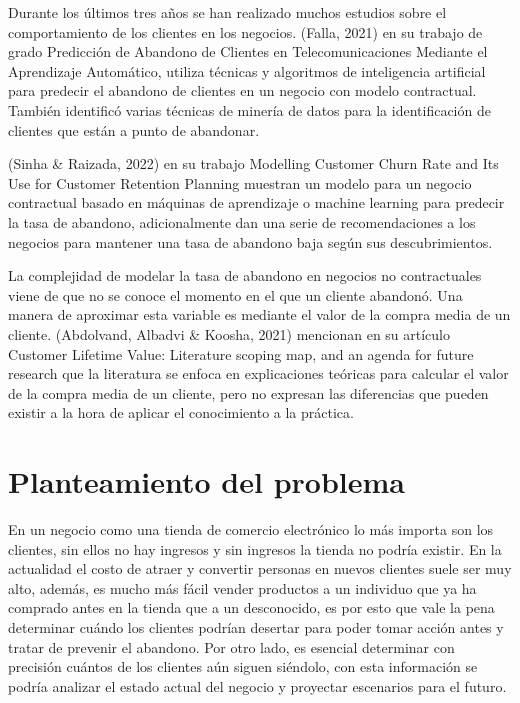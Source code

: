 Durante los últimos tres años se han realizado muchos estudios sobre el comportamiento de los clientes en los negocios. (Falla, 2021) \cite{Falla2022} en su trabajo de grado Predicción de Abandono de Clientes en Telecomunicaciones Mediante el Aprendizaje Automático, utiliza técnicas y algoritmos de inteligencia artificial para predecir el abandono de clientes en un negocio con modelo contractual. También identificó varias técnicas de minería de datos para la identificación de clientes que están a punto de abandonar.


(Sinha \& Raizada,  2022) \cite{SinhaRaizada2022} en su trabajo Modelling Customer Churn Rate and Its Use for Customer Retention Planning muestran un modelo para un negocio contractual basado en máquinas de aprendizaje o machine learning para predecir la tasa de abandono, adicionalmente dan una serie de recomendaciones a los negocios para mantener una tasa de abandono baja según sus descubrimientos.


La complejidad de modelar la tasa de abandono en negocios no contractuales viene de que no se conoce el momento en el que un cliente abandonó. Una manera de aproximar esta variable es mediante el valor de la compra media de un cliente. (Abdolvand, Albadvi \& Koosha, 2021) \cite{AbdolvandAlbadviKoosha2021} mencionan en su artículo Customer Lifetime Value: Literature scoping map, and an agenda for future research que la literatura se enfoca en explicaciones teóricas para calcular el valor de la compra media de un cliente, pero no expresan las diferencias que pueden existir a la hora de aplicar el conocimiento a la práctica.


\section{Planteamiento del problema}

En un negocio como una tienda de comercio electrónico lo más importa son los clientes, sin ellos no hay ingresos y sin ingresos la tienda no podría existir. En la actualidad el costo de atraer y convertir personas en nuevos clientes suele ser muy alto, además, es mucho más fácil vender productos a un individuo que ya ha comprado antes en la tienda que a un desconocido, es por esto que vale la pena determinar cuándo los clientes podrían desertar para poder tomar acción antes y tratar de prevenir el abandono. Por otro lado, es esencial determinar con precisión cuántos de los clientes aún siguen siéndolo, con esta información se podría analizar el estado actual del negocio y proyectar escenarios para el futuro.


